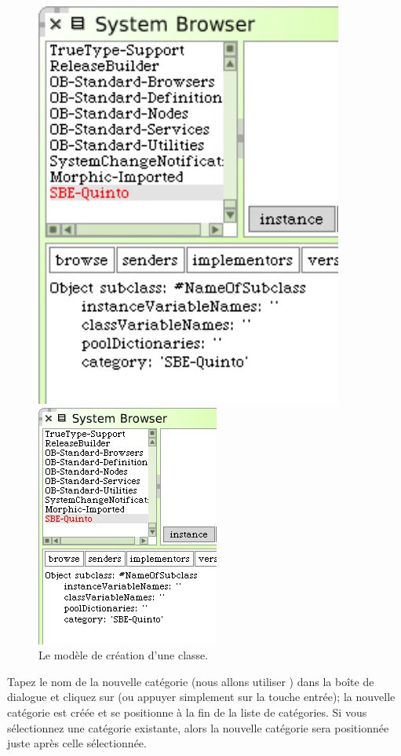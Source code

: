 \documentclass[a4paper,10pt,twoside]{book}
\begin{document}
\begin{figure}[htb]
\begin{minipage}[b]{0.48\textwidth}
	{\centerline {\includegraphics[width=0.9\textwidth]{ClassTemplate}}}
	{\centerline {\includegraphics[scale=0.7]{ClassTemplate}}}
	\caption{Le modèle de création d'une classe.
	\label{fig:classTemplate}}
\end{minipage}
\end{figure}

Tapez le nom de la nouvelle catégorie (nous allons utiliser
) dans la boîte de dialogue et cliquez sur
 (ou appuyer simplement sur la touche entrée); la nouvelle catégorie est créée et se positionne à la fin de la liste de catégories.
Si vous sélectionnez une catégorie existante, alors la nouvelle catégorie sera positionnée juste après celle sélectionnée.
\end{document}

